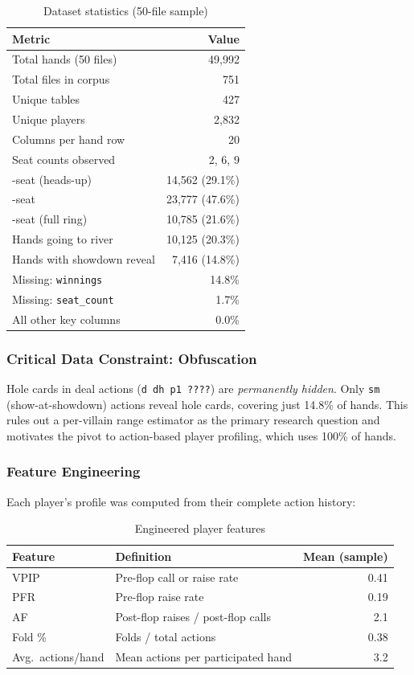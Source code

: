 \documentclass{article}
\begin{document}
\begin{table}[H]
\centering
\caption{Dataset statistics (50-file sample)}
\label{tab:stats}
\begin{tabular}{lr}
\toprule
\textbf{Metric} & \textbf{Value} \\
\midrule
Total hands (50 files) & 49,992 \\
Total files in corpus  & 751 \\
Unique tables          & 427 \\
Unique players         & 2,832 \\
Columns per hand row   & 20 \\
\midrule
Seat counts observed   & 2, 6, 9 \\
\quad 2-seat (heads-up) & 14,562 (29.1\%) \\
\quad 6-seat           & 23,777 (47.6\%) \\
\quad 9-seat (full ring)& 10,785 (21.6\%) \\
\midrule
Hands going to river   & 10,125 (20.3\%) \\
Hands with showdown reveal & 7,416 (14.8\%) \\
\midrule
Missing: \texttt{winnings}  & 14.8\% \\
Missing: \texttt{seat\_count} & 1.7\% \\
All other key columns  & 0.0\% \\
\bottomrule
\end{tabular}
\end{table}

\subsubsection{Critical Data Constraint: Obfuscation}
Hole cards in deal actions (\texttt{d dh p1 ????}) are \emph{permanently hidden}.
Only \texttt{sm} (show-at-showdown) actions reveal hole cards, covering just 14.8\% of hands.
This rules out a per-villain range estimator as the primary research question and motivates
the pivot to action-based player profiling, which uses 100\% of hands.

\subsubsection{Feature Engineering}
Each player's profile was computed from their complete action history:

\begin{table}[H]
\centering
\caption{Engineered player features}
\label{tab:features}
\begin{tabular}{llr}
\toprule
\textbf{Feature} & \textbf{Definition} & \textbf{Mean (sample)} \\
\midrule
VPIP & Pre-flop call or raise rate & 0.41 \\
PFR  & Pre-flop raise rate & 0.19 \\
AF   & Post-flop raises / post-flop calls & 2.1 \\
Fold \% & Folds / total actions & 0.38 \\
Avg.\ actions/hand & Mean actions per participated hand & 3.2 \\
\bottomrule
\end{tabular}
\end{table}
\end{document}
